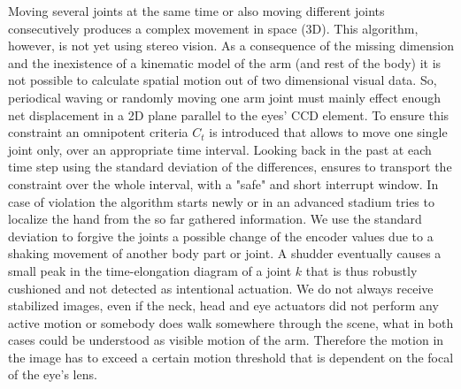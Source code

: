 \documentclass[conference]{IEEEtran}
\begin{document}
Moving several joints at the same time or also moving different joints consecutively produces a complex movement in space (3D). This algorithm, however, is not yet using stereo vision. As a consequence of the missing dimension and the inexistence of a kinematic model of the arm (and rest of the body) it is not possible to calculate spatial motion out of two dimensional visual data. So, periodical waving or randomly moving one arm joint must mainly effect enough net displacement in a 2D plane parallel to the eyes' CCD element. 
To ensure this constraint an omnipotent criteria $ C_t $ is introduced that allows to move one single joint only, over an appropriate time interval. Looking back in the past at each time step using the standard deviation of the differences, ensures to transport the constraint over the whole interval, with a "safe" and short interrupt window.  In case of violation the algorithm starts newly or in an advanced stadium tries to localize the hand from the so far gathered information. We use the standard deviation to forgive the joints a possible change of the encoder values due to a shaking movement of another body part or joint. A shudder eventually causes a small peak in the time-elongation diagram of a joint $k$ that is thus robustly cushioned and not detected as intentional actuation.
%
We do not always receive stabilized images, even if the neck, head and eye actuators did not perform any active motion or somebody does walk somewhere through the scene, what in both cases could be understood as visible motion of the arm. Therefore the motion in the image has to exceed a certain motion threshold that is dependent on the focal of the eye's lens.
%
%
%
\end{document}
